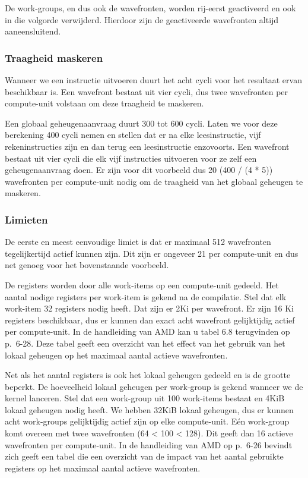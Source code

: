 De work-groups, en dus ook de wavefronten, worden rij-eerst geactiveerd en ook in die volgorde verwijderd\cite[p.~6-8]{amd}. Hierdoor zijn de geactiveerde wavefronten altijd aaneensluitend.

\subsubsection{Traagheid maskeren}
Wanneer we een instructie uitvoeren duurt het acht cycli voor het resultaat ervan beschikbaar is. Een wavefront bestaat uit vier cycli, dus twee wavefronten per compute-unit volstaan om deze traagheid te maskeren.

Een globaal geheugenaanvraag duurt 300 tot 600 cycli. Laten we voor deze berekening 400 cycli nemen en stellen dat er na elke leesinstructie, vijf rekeninstructies zijn en dan terug een leesinstructie enzovoorts. Een wavefront bestaat uit vier cycli die elk vijf instructies uitvoeren voor ze zelf een geheugenaanvraag doen. Er zijn voor dit voorbeeld dus 20 (400 / (4 * 5)) wavefronten per compute-unit nodig om de traagheid van het globaal geheugen te maskeren.

\subsubsection{Limieten}
De eerste en meest eenvoudige limiet is dat er maximaal 512 wavefronten tegelijkertijd actief kunnen zijn. Dit zijn er ongeveer 21 per compute-unit en dus net genoeg voor het bovenstaande voorbeeld.

De registers worden door alle work-items op een compute-unit gedeeld. Het aantal nodige registers per work-item is gekend na de compilatie. Stel dat elk work-item 32 registers nodig heeft. Dat zijn er 2Ki per wavefront. Er zijn 16 Ki registers beschikbaar, dus er kunnen dan exact acht wavefront gelijktijdig actief per compute-unit. In de handleiding van AMD \cite{amd} kan u tabel 6.8 terugvinden op p.~6-28. Deze tabel geeft een overzicht van het effect van het gebruik van het lokaal geheugen op het maximaal aantal actieve wavefronten.

Net als het aantal registers is ook het lokaal geheugen gedeeld en is de grootte beperkt. De hoeveelheid lokaal geheugen per work-group is gekend wanneer we de kernel lanceren. Stel dat een work-group uit 100 work-items bestaat en 4KiB lokaal geheugen nodig heeft. We hebben 32KiB lokaal geheugen, dus er kunnen acht work-groups gelijktijdig actief zijn op elke compute-unit. E\'en work-group komt overeen met twee wavefronten (64 < 100 < 128). Dit geeft dan 16 actieve wavefronten per compute-unit.  In de handleiding van AMD \cite{amd} op p.~6-26 bevindt zich geeft een tabel die een overzicht van de impact van het aantal gebruikte registers op het maximaal aantal actieve wavefronten.


